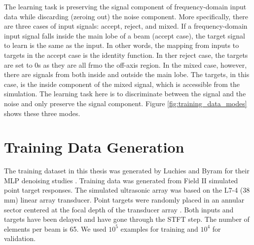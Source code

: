 The learning task is preserving the signal component of frequency-domain input data while discarding (zeroing out) the noise component. More specifically, there are three cases of input signals: accept, reject, and mixed. If a frequency-domain input signal falls inside the main lobe of a beam (accept case), the target signal to learn is the same as the input. In other words, the mapping from inputs to targets in the accept case is the identity function. In ther reject case, the targets are set to 0s as they are all frmo the off-axis region. In the mixed case, however, there are signals from both inside and outside the main lobe. The targets, in this case, is the inside component of the mixed signal, which is accessible from the simulation. The learning task here is to discriminate between the signal and the noise and only preserve the signal component. Figure \ref{fig:training_data_modes} shows these three modes.


\section{Training Data Generation}

The training dataset in this thesis was generated by Luchies and Byram for their MLP denoising studies \cite{luchies_tmi_2018}. Training data was generated from Field II \cite{jensen1992calculation, jensen1996field} simulated point target responses. The simulated ultrasonic array was based on the L7-4 (38 mm) linear array transducer. Point targets were randomly placed in an annular sector centered at the focal depth of the transducer array \cite{training_improvements}. Both inputs and targets have been delayed and have gone through the STFT step. The number of elements per beam is 65. We used $10^5$ examples for training and $10^4$ for validation.








